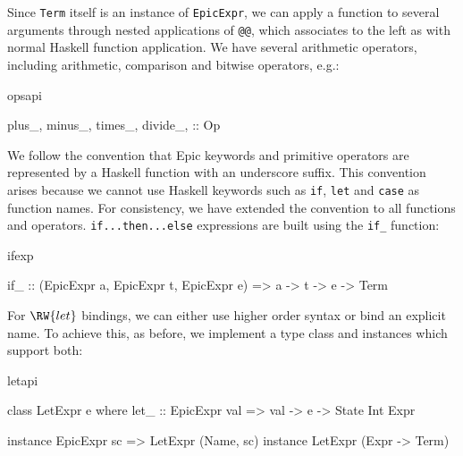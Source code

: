 \noindent
Since \texttt{Term} itself is an instance of \texttt{EpicExpr}, we can
apply a function to several arguments through nested applications of
\texttt{@@}, which associates to the left as with normal Haskell
function application. We have several arithmetic operators, including
arithmetic, comparison and bitwise operators, e.g.:

\begin{SaveVerbatim}{opsapi}

plus_, minus_, times_, divide_,    :: Op

\end{SaveVerbatim}

\noindent
We follow the convention that Epic keywords and primitive
operators are represented by a Haskell function with an underscore
suffix. This convention arises because we cannot use Haskell keywords
such as \texttt{if}, \texttt{let} and \texttt{case} as function names.
For consistency, we have extended the convention to all functions and
operators. \texttt{if...then...else} expressions are built using the
\texttt{if\_} function:

\begin{SaveVerbatim}{ifexp}

if_ :: (EpicExpr a, EpicExpr t, EpicExpr e) => a -> t -> e -> Term

\end{SaveVerbatim}

\noindent
For $\RW{let}$ bindings, we can either use higher order syntax or bind
an explicit name. To achieve this, as before, we implement a type
class and instances which support both:

\begin{SaveVerbatim}{letapi}

class LetExpr e where
    let_ :: EpicExpr val => val -> e -> State Int Expr

instance EpicExpr sc => LetExpr (Name, sc)
instance                LetExpr (Expr -> Term)

\end{SaveVerbatim}




